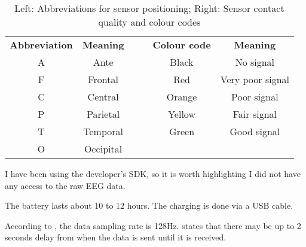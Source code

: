 \begin{table}[h]
\centering
\begin{tabular}{|c|c|llcc}
\cline{1-2} \cline{5-6}
\textbf{Abbreviation} & \textbf{Meaning} &  & \multicolumn{1}{l|}{} & \multicolumn{1}{c|}{\textbf{Colour code}}          & \multicolumn{1}{c|}{\textbf{Meaning}} \\ \cline{1-2} \cline{5-6} 
A                     & Ante             &  & \multicolumn{1}{l|}{} & \multicolumn{1}{c|}{Black}                         & \multicolumn{1}{c|}{No signal}        \\ \cline{1-2} \cline{5-6} 
F                     & Frontal          &  & \multicolumn{1}{l|}{} & \multicolumn{1}{c|}{{\color[HTML]{FE0000} Red}}    & \multicolumn{1}{c|}{Very poor signal} \\ \cline{1-2} \cline{5-6} 
C                     & Central          &  & \multicolumn{1}{l|}{} & \multicolumn{1}{c|}{{\color[HTML]{F8A102} Orange}} & \multicolumn{1}{c|}{Poor signal}      \\ \cline{1-2} \cline{5-6} 
P                     & Parietal         &  & \multicolumn{1}{l|}{} & \multicolumn{1}{c|}{{\color[HTML]{F8FF00} Yellow}} & \multicolumn{1}{c|}{Fair signal}      \\ \cline{1-2} \cline{5-6} 
T                     & Temporal         &  & \multicolumn{1}{l|}{} & \multicolumn{1}{c|}{{\color[HTML]{32CB00} Green}}  & \multicolumn{1}{c|}{Good signal}      \\ \cline{1-2} \cline{5-6} 
O                     & Occipital        &  &                       & \multicolumn{1}{l}{}                               & \multicolumn{1}{l}{}                  \\ \cline{1-2}
\end{tabular}
\caption {Left: Abbreviations for sensor positioning; Right: Sensor contact quality and colour codes}
\label{table:sensorName}
\end{table}

I have been using the developer's SDK, so it is worth highlighting I did not have any access to the raw EEG data. 

The battery lasts about 10 to 12 hours. The charging is done via a USB cable.

According to \cite{experimenterEPOC}, the data sampling rate is 128Hz. \cite{emotivUserManual} states that there may be up to 2 seconds delay from when the data is sent until it is received. 

